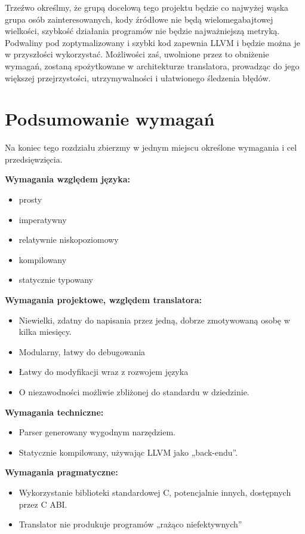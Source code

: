 Trzeźwo określmy, że grupą docelową tego projektu będzie co najwyżej wąska grupa osób zainteresowanych, kody źródłowe nie będą wielomegabajtowej wielkości, szybkość działania programów nie będzie najważniejszą metryką. Podwaliny pod zoptymalizowany i szybki kod zapewnia LLVM i będzie można je w przyszłości wykorzystać. Możliwości zaś, uwolnione przez to obniżenie wymagań, zostaną spożytkowane w architekturze translatora, prowadząc do jego większej przejrzystości, utrzymywalności i ułatwionego śledzenia błędów.


\section{Podsumowanie wymagań}
Na koniec tego rozdziału zbierzmy w jednym miejscu określone wymagania i cel przedsięwzięcia.

\textbf{Wymagania względem języka:}
\begin{itemize}[noitemsep]
    \item prosty
    \item imperatywny
    \item relatywnie niskopoziomowy
    \item kompilowany
    \item statycznie typowany
\end{itemize}

\textbf{Wymagania projektowe, względem translatora:}
\begin{itemize}[noitemsep]
    \item Niewielki, zdatny do napisania przez jedną, dobrze zmotywowaną osobę w kilka miesięcy.
    \item Modularny, łatwy do debugowania
    \item Łatwy do modyfikacji wraz z rozwojem języka
    \item O niezawodności możliwie zbliżonej do standardu w dziedzinie.
\end{itemize}

\textbf{Wymagania techniczne:}
\begin{itemize}[noitemsep]
    \item Parser generowany wygodnym narzędziem.
    \item Statycznie kompilowany, używając LLVM jako „back-endu”.
\end{itemize}

\textbf{Wymagania pragmatyczne:}
\begin{itemize}[noitemsep]
    \item Wykorzystanie biblioteki standardowej C, potencjalnie innych, dostępnych przez C ABI.
    \item Translator nie produkuje programów „rażąco niefektywnych”
\end{itemize}
